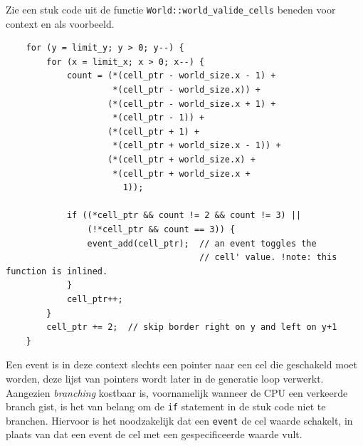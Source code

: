 \documentclass[10pt]{article}
\begin{document}
Zie een stuk code uit de functie \verb|World::world_valide_cells| beneden voor context en als voorbeeld.
\begin{verbatim}
    for (y = limit_y; y > 0; y--) {
        for (x = limit_x; x > 0; x--) {
            count = (*(cell_ptr - world_size.x - 1) +
                     *(cell_ptr - world_size.x)) +
                    (*(cell_ptr - world_size.x + 1) +
                     *(cell_ptr - 1)) +
                    (*(cell_ptr + 1) +
                     *(cell_ptr + world_size.x - 1)) +
                    (*(cell_ptr + world_size.x) +
                     *(cell_ptr + world_size.x +
                       1));

            if ((*cell_ptr && count != 2 && count != 3) ||
                (!*cell_ptr && count == 3)) {
                event_add(cell_ptr);  // an event toggles the
                                      // cell' value. !note: this function is inlined.
            }
            cell_ptr++;
        }
        cell_ptr += 2;  // skip border right on y and left on y+1
    }
\end{verbatim}

Een event is in deze context slechts een pointer naar een cel die geschakeld moet worden, deze
lijst van pointers wordt later in de generatie loop verwerkt. Aangezien \textit{branching} kostbaar is, voornamelijk
wanneer de
CPU een verkeerde branch gist, is het van belang om de
\verb|if| statement in de stuk code niet te branchen\cite{cpu-cost-instructions}. Hiervoor is het noodzakelijk dat een
\verb|event| de cel waarde schakelt, in plaats van dat een event de cel met een gespecificeerde
waarde vult.
\end{document}
